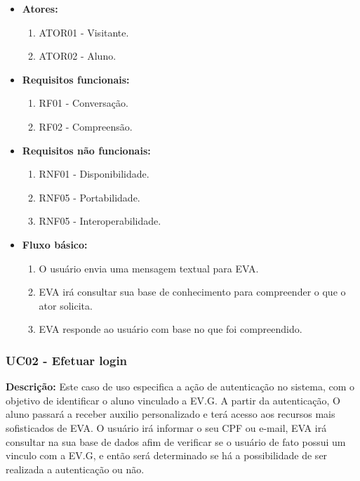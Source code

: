 \begin{itemize}
    \item \textbf{Atores:}
        \begin{enumerate}
            \item ATOR01 - Visitante.
            \item ATOR02 - Aluno.
        \end{enumerate}
    \item \textbf{Requisitos funcionais:}
        \begin{enumerate}
            \item RF01 - Conversação.
            \item RF02 - Compreensão.
        \end{enumerate}
    \item \textbf{Requisitos não funcionais:}
        \begin{enumerate}
            \item RNF01 - Disponibilidade.
            \item RNF05 - Portabilidade.
            \item RNF05 - Interoperabilidade.
        \end{enumerate}
    \item \textbf{Fluxo básico:} 
        \begin{enumerate}
            \item O usuário envia uma mensagem textual para EVA.
            \item EVA irá consultar sua base de conhecimento para compreender o que o ator solicita.
            \item EVA responde ao usuário com base no que foi compreendido.
        \end{enumerate}
\end{itemize}

\subsubsection{UC02 - Efetuar login}
\textbf{Descrição:} Este caso de uso especifica a ação de autenticação no sistema, com o objetivo de identificar o aluno vinculado a EV.G. A partir da autenticação, O aluno passará a receber auxilio personalizado e terá acesso aos recursos mais sofisticados de EVA. O usuário irá informar o seu CPF ou e-mail, EVA irá consultar na sua base de dados afim de verificar se o usuário de fato possui um vinculo com a EV.G, e então será determinado se há a possibilidade de ser realizada a autenticação ou não.

